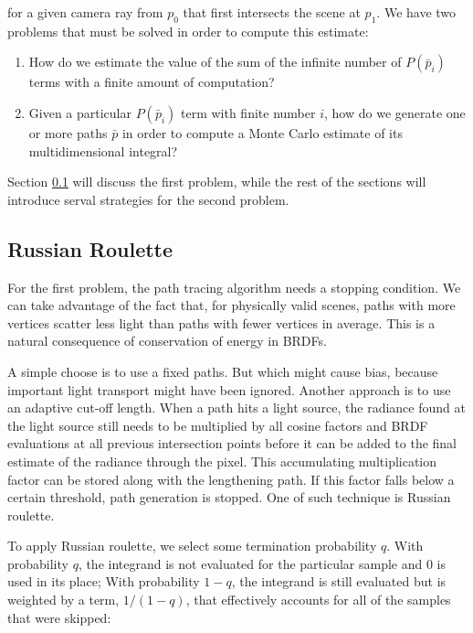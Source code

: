 for a given camera ray from $p_0$ that first intersects the scene at $p_1$. We have two problems that must be solved in order to compute this estimate:

\begin{enumerate}
	\item How do we estimate the value of the sum of the infinite number of $P(\bar{p}_i)$ terms with a finite amount of computation?
	\item Given a particular $P(\bar{p}_i)$ term with finite number $i$, how do we generate one or more paths $\bar{p}$ in order to compute a Monte Carlo estimate of its multidimensional integral?
\end{enumerate}

Section \ref{sec:russian-roulette} will discuss the first problem, while the rest of the sections will introduce serval strategies for the second problem.



\subsection{Russian Roulette}\label{sec:russian-roulette}
For the first problem, the path tracing algorithm needs a stopping condition. We can take advantage of the fact that, for physically valid scenes, paths with more vertices scatter less light than paths with fewer vertices in average. This is a natural consequence of conservation of energy in BRDFs. 

A simple choose is to use a fixed paths. But which might cause bias, because important light transport might have been ignored. Another approach is to use an adaptive cut-off length. When a path hits a light source, the radiance found at the light source still needs to be multiplied by all cosine factors and BRDF evaluations at all previous intersection points before it can be added to the final estimate of the radiance through the pixel. This accumulating multiplication factor can be stored along with the lengthening path. If this factor falls below a certain threshold, path generation is stopped. One of such technique is Russian roulette.

To apply Russian roulette, we select some termination probability $q$. With probability $q$, the integrand is not evaluated for the particular sample and $0$ is used in its place; With probability $1-q$, the integrand is still evaluated but is weighted by a term, $1/(1-q)$, that effectively accounts for all of the samples that were skipped:

